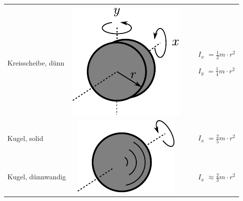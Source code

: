 \begin{table}[h!]
\begin{tabular}{m{2cm} c m{}}
\begin{itemize}
                \end{itemize} \\
Kreisscheibe, dünn &
        \begin{minipage}{0.3\textwidth}
        \centering
        \includegraphics[scale=\traegscale]{traeg/traeg-kreisscheibe-duenn.pdf}
        \end{minipage} &
                \begin{itemize}
                \item[$I_x$]$= \frac12 m \cdot r^2$
                \item[$I_y$]$= \frac14 m \cdot r^2$
                \end{itemize} \\
Kugel, solid & \multirow{2}{*}{
        \begin{minipage}{0.3\textwidth}
        \centering
        \includegraphics[scale=\traegscale]{traeg/traeg-kugel.pdf}
        \end{minipage}}
                &
                \begin{itemize}
                        \item[$I_x$]$= \frac{2}{5} m \cdot r^2$
                \end{itemize} \\
Kugel, dünnwandig & &
                \begin{itemize}
                        \item[$I_x$]$\approx \frac{2}{3} m \cdot r^2$
                \end{itemize}
\end{tabular}
\end{table}

